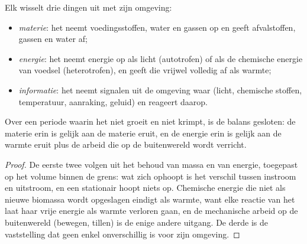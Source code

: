 \begin{proposition}\label{prop:b1:organism-environment:exchanges}
Elk  wisselt drie dingen uit met zijn omgeving:
\begin{itemize}
  \item \emph{materie}: het neemt voedingsstoffen,
        water en gassen op en geeft afvalstoffen, gassen en water af;
  \item \emph{energie}: het neemt energie op als
        licht (autotrofen) of als de chemische energie van voedsel
        (heterotrofen), en geeft die vrijwel volledig af als warmte;
  \item \emph{informatie}: het neemt
        signalen uit de omgeving waar (licht, chemische stoffen,
        temperatuur, aanraking, geluid) en reageert daarop.
\end{itemize}
Over een periode waarin het  niet groeit en niet krimpt, is de
balans gesloten: de materie erin is gelijk aan de materie eruit, en de
energie erin is gelijk aan de warmte eruit plus de arbeid die op de
buitenwereld wordt verricht.
\end{proposition}
\begin{proof}
De eerste twee volgen uit het behoud van massa en van energie, toegepast
op het volume binnen de grens: wat zich ophoopt is het verschil tussen
instroom en uitstroom, en een stationair  hoopt niets op.
Chemische energie die niet als nieuwe biomassa wordt opgeslagen eindigt
als warmte, want elke reactie van het  laat haar vrije energie
als warmte verloren gaan, en de mechanische arbeid op de buitenwereld
(bewegen, tillen) is de enige andere uitgang. De derde is de vaststelling
dat geen enkel  onverschillig is voor zijn omgeving.
\end{proof}

